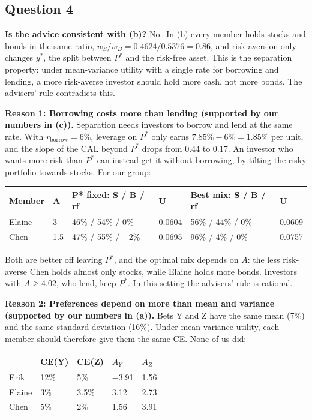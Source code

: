 \documentclass[11pt]{article}
\begin{document}
    \subsection{Question 4}\label{question-4}

\textbf{Is the advice consistent with (b)?} No.~In (b) every member
holds stocks and bonds in the same ratio,
\(w_S/w_B = 0.4624/0.5376 = 0.86\), and risk aversion only changes
\(y^*\), the split between \(P^*\) and the risk-free asset. This is the
separation property: under mean-variance utility with a single rate for
borrowing and lending, a more risk-averse investor should hold more
cash, not more bonds. The advisers' rule contradicts this.

\textbf{Reason 1: Borrowing costs more than lending (supported by our
numbers in (c)).} Separation needs investors to borrow and lend at the
same rate. With \(r_{\text{borrow}} = 6\%\), leverage on \(P^*\) only
earns \(7.85\% - 6\% = 1.85\%\) per unit, and the slope of the CAL
beyond \(P^*\) drops from 0.44 to 0.17. An investor who wants more risk
than \(P^*\) can instead get it without borrowing, by tilting the risky
portfolio towards stocks. For our group:

\begin{longtable}[]{@{}llllll@{}}
\toprule\noalign{}
Member & A & P* fixed: S / B / rf & U & Best mix: S / B / rf & U \\
\midrule\noalign{}
\endhead
\bottomrule\noalign{}
\endlastfoot
Elaine & 3 & 46\% / 54\% / 0\% & 0.0604 & 56\% / 44\% / 0\% & 0.0609 \\
Chen & 1.5 & 47\% / 55\% / −2\% & 0.0695 & 96\% / 4\% / 0\% & 0.0757 \\
\end{longtable}

Both are better off leaving \(P^*\), and the optimal mix depends on
\(A\): the less risk-averse Chen holds almost only stocks, while Elaine
holds more bonds. Investors with \(A \geq 4.02\), who lend, keep
\(P^*\). In this setting the advisers' rule is rational.

\textbf{Reason 2: Preferences depend on more than mean and variance
(supported by our numbers in (a)).} Bets Y and Z have the same mean
(7\%) and the same standard deviation (16\%). Under mean-variance
utility, each member should therefore give them the same CE. None of us
did:

\begin{longtable}[]{@{}lllll@{}}
\toprule\noalign{}
& CE(Y) & CE(Z) & \(A_Y\) & \(A_Z\) \\
\midrule\noalign{}
\endhead
\bottomrule\noalign{}
\endlastfoot
Erik & 12\% & 5\% & −3.91 & 1.56 \\
Elaine & 3\% & 3.5\% & 3.12 & 2.73 \\
Chen & 5\% & 2\% & 1.56 & 3.91 \\
\end{longtable}
\end{document}

